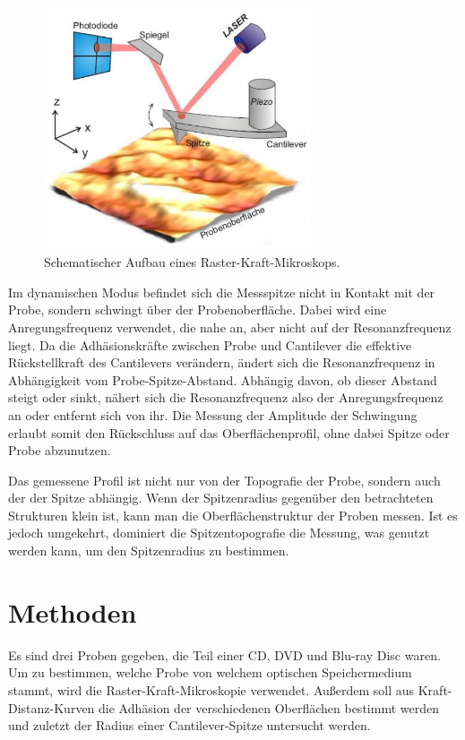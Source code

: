 \documentclass[
	a4paper,
	12pt,
	pagesize,
	ngerman
]{scrartcl}
\begin{document}
	\begin{figure}[H]
		\includegraphics[width=0.7\textwidth]{images/sonstiges/Aufbau}
		\centering
		\caption{Schematischer Aufbau eines Raster-Kraft-Mikroskops. \cite{Anleitung}}
		\label{fig_Aufbau}
		\centering
	\end{figure}
	Im dynamischen Modus befindet sich die Messspitze nicht in Kontakt mit der Probe, sondern schwingt über der Probenoberfläche.
	Dabei wird eine Anregungsfrequenz verwendet, die nahe an, aber nicht auf der Resonanzfrequenz liegt. %
	Da die Adhäsionskräfte zwischen Probe und Cantilever die effektive Rückstellkraft des Cantilevers verändern, ändert sich die Resonanzfrequenz in Abhängigkeit vom Probe-Spitze-Abstand.
	Abhängig davon, ob dieser Abstand steigt oder sinkt, nähert sich die Resonanzfrequenz also der Anregungsfrequenz an oder entfernt sich von ihr.
	Die Messung der Amplitude der Schwingung erlaubt somit den Rückschluss auf das Oberflächenprofil, ohne dabei Spitze oder Probe abzunutzen.
	
	Das gemessene Profil ist nicht nur von der Topografie der Probe, sondern auch der der Spitze abhängig.
	Wenn der Spitzenradius gegenüber den betrachteten Strukturen klein ist, kann man die Oberflächenstruktur der Proben messen.
	Ist es jedoch umgekehrt, dominiert die Spitzentopografie die Messung, was genutzt werden kann, um den Spitzenradius zu bestimmen. %
	\section{Methoden}
	\label{sec_methoden}
	Es sind drei Proben gegeben, die Teil einer CD, DVD und Blu-ray Disc waren.
	Um zu bestimmen, welche Probe von welchem optischen Speichermedium stammt, wird die Raster-Kraft-Mikroskopie verwendet.
	Außerdem soll aus Kraft-Distanz-Kurven die Adhäsion der verschiedenen Oberflächen bestimmt werden und zuletzt der Radius einer Cantilever-Spitze untersucht werden.
\end{document}
